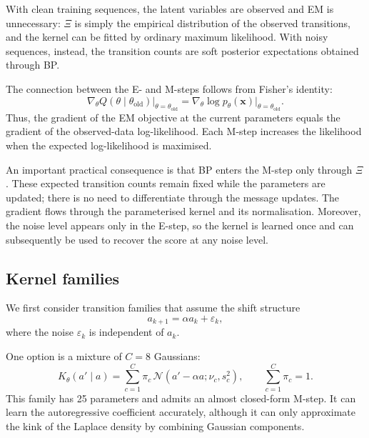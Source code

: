 With clean training sequences, the latent variables are
observed and EM is unnecessary: $\Xi$ is simply the
empirical distribution of the observed transitions, and
the kernel can be fitted by ordinary maximum likelihood.
With noisy sequences, instead, the transition counts are
soft posterior expectations obtained through BP.

The connection between the E- and M-steps follows from
Fisher's identity:
\begin{equation}
    \left.
    \nabla_\theta Q(\theta\mid\theta_{\mathrm{old}})
    \right|_{\theta=\theta_{\mathrm{old}}}
    =
    \nabla_\theta
    \log p_\theta(\mathbf{x})
    \big|_{\theta=\theta_{\mathrm{old}}}.
\end{equation}
Thus, the gradient of the EM objective at the current
parameters equals the gradient of the observed-data
log-likelihood. Each M-step increases the likelihood
when the expected log-likelihood is maximised.

An important practical consequence is that BP enters
the M-step only through $\Xi$. These expected transition
counts remain fixed while the parameters are updated;
there is no need to differentiate through the message
updates. The gradient flows through the parameterised
kernel and its normalisation. Moreover, the noise level
appears only in the E-step, so the kernel is learned once
and can subsequently be used to recover the score at
any noise level.

\subsection{Kernel families}
\label{sec:kernel-families}

We first consider transition families that assume the
shift structure
\begin{equation}
    a_{k+1}=\alpha a_k+\varepsilon_k,
\end{equation}
where the noise $\varepsilon_k$ is independent of
$a_k$.

One option is a mixture of $C=8$ Gaussians:
\begin{equation}
    K_\theta(a'\mid a)
    =
    \sum_{c=1}^{C}
    \pi_c\,
    \mathcal{N}
    \left(
        a'-\alpha a;\nu_c,s_c^2
    \right),
    \qquad
    \sum_{c=1}^{C}\pi_c=1.
\end{equation}
This family has 25 parameters and admits an almost
closed-form M-step. It can learn the autoregressive
coefficient accurately, although it can only approximate
the kink of the Laplace density by combining Gaussian
components.

